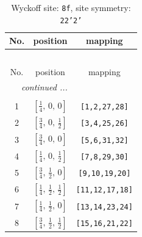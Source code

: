 \documentclass[fleqn,8pt]{jsarticle}
\begin{document}
\begin{longtable}{ccc}
\caption{Wyckoff site: {\tt 8f}, site symmetry: {\tt 22'2'}}
 \\
 \hline \hline
No. & position & mapping \\ \hline \endfirsthead

\multicolumn{2}{l}{\tablename\ \thetable{}} \\
 \hline \hline
No. & position & mapping \\ \hline \endhead

 \hline \hline
\multicolumn{2}{r}{\footnotesize\it continued ...} \\ \endfoot

 \hline \hline
\multicolumn{2}{r}{} \\ \endlastfoot

1 & $\left[ \frac{1}{4},\, 0,\, 0 \right]$ & {\tt [1,2,27,28]} \\ \hline
2 & $\left[ \frac{3}{4},\, 0,\, \frac{1}{2} \right]$ & {\tt [3,4,25,26]} \\ \hline
3 & $\left[ \frac{3}{4},\, 0,\, 0 \right]$ & {\tt [5,6,31,32]} \\ \hline
4 & $\left[ \frac{1}{4},\, 0,\, \frac{1}{2} \right]$ & {\tt [7,8,29,30]} \\ \hline
5 & $\left[ \frac{3}{4},\, \frac{1}{2},\, 0 \right]$ & {\tt [9,10,19,20]} \\ \hline
6 & $\left[ \frac{1}{4},\, \frac{1}{2},\, \frac{1}{2} \right]$ & {\tt [11,12,17,18]} \\ \hline
7 & $\left[ \frac{1}{4},\, \frac{1}{2},\, 0 \right]$ & {\tt [13,14,23,24]} \\ \hline
8 & $\left[ \frac{3}{4},\, \frac{1}{2},\, \frac{1}{2} \right]$ & {\tt [15,16,21,22]} \\
\end{longtable}
\renewcommand{\arraystretch}{1.2}
\end{document}
